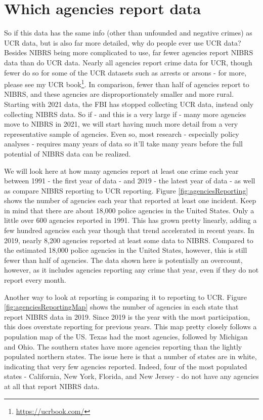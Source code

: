 \documentclass[
]{krantz}
\renewcommand{\href}[2]{#2\footnote{\url{#1}}}
\begin{document}
\section{Which agencies report
data}\label{which-agencies-report-data}

So if this data has the same info (other than unfounded and
negative crimes) as UCR data, but is also far more detailed,
why do people ever use UCR data? Besides NIBRS being more
complicated to use, far fewer agencies report NIBRS data
than do UCR data. Nearly all agencies report crime data for
UCR, though fewer do so for some of the UCR datasets such as
arrests or arsons - for more, please see my
\href{https://ucrbook.com/}{UCR book}. In comparison, fewer
than half of agencies report to NIBRS, and these agencies
are disproportionately smaller and more rural. Starting with
2021 data, the FBI has stopped collecting UCR data, instead
only collecting NIBRS data. So if - and this is a very large
if - many more agencies move to NIBRS in 2021, we will start
having much more detail from a very representative sample of
agencies. Even so, most research - especially policy
analyses - requires many years of data so it'll take many
years before the full potential of NIBRS data can be
realized.

We will look here at how many agencies report at least one
crime each year between 1991 - the first year of data - and
2019 - the latest year of data - as well as compare NIBRS
reporting to UCR reporting. Figure
\ref{fig:agenciesReporting} shows the number of agencies
each year that reported at least one incident. Keep in mind
that there are about 18,000 police agencies in the United
States. Only a little over 600 agencies reported in 1991.
This has grown pretty linearly, adding a few hundred
agencies each year though that trend accelerated in recent
years. In 2019, nearly 8,200 agencies reported at least some
data to NIBRS. Compared to the estimated 18,000 police
agencies in the United States, however, this is still fewer
than half of agencies. The data shown here is potentially an
overcount, however, as it includes agencies reporting any
crime that year, even if they do not report every month.

Another way to look at reporting is comparing it to
reporting to UCR. Figure \ref{fig:agenciesReportingMap}
shows the number of agencies in each state that report NIBRS
data in 2019. Since 2019 is the year with the most
participation, this does overstate reporting for previous
years. This map pretty closely follows a population map of
the US. Texas had the most agencies, followed by Michigan
and Ohio. The southern states have more agencies reporting
than the lightly populated northern states. The issue here
is that a number of states are in white, indicating that
very few agencies reported. Indeed, four of the most
populated states - California, New York, Florida, and New
Jersey - do not have any agencies at all that report NIBRS
data.
\end{document}
